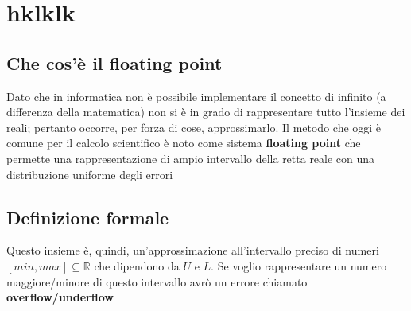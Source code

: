 \section{hklklk}

\subsection{Che cos'è il floating point}
Dato che in informatica non è possibile implementare il concetto di infinito (a differenza della matematica) non si è in grado di rappresentare tutto l'insieme dei reali; pertanto occorre, per forza di cose, approssimarlo. Il metodo che oggi è comune per il calcolo scientifico è noto come sistema \textbf{floating point} che permette una rappresentazione di ampio intervallo della retta reale con una distribuzione uniforme degli errori 


\subsection{Definizione formale}

Questo insieme è, quindi, un'approssimazione all'intervallo preciso di numeri $[min, max] \subseteq \mathbb{R}$ che dipendono da $U$ e $L$. Se voglio rappresentare un numero maggiore/minore di questo intervallo avrò un errore chiamato \textbf{overflow/underflow}



